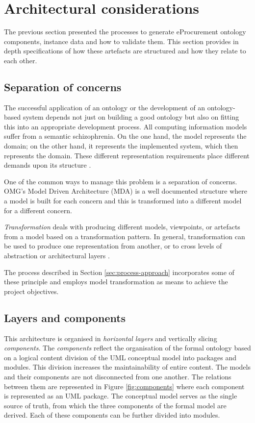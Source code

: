 \section{Architectural considerations}
\label{sec:architecture}

	The previous section presented the processes to generate eProcurement ontology components, instance data and how to validate them. This section provides in depth specifications of how these artefacts are structured and how they relate to each other. 

	\subsection{Separation of concerns}
	\label{sec:separation-conceprns}
	
	The successful application of an ontology or the development of an ontology-based system depends not just on building a good ontology but also on fitting this into an appropriate development  process.  All computing information models suffer from a semantic schizophrenia. On the one hand, the model represents the domain; on the other hand, it represents the implemented system, which then represents the domain. These different representation requirements place different demands upon its structure \cite{partridge2013}.
	
	One of the common ways to manage this problem is a separation of concerns. OMG's Model Driven Architecture (MDA) \cite{mda-paper} is a well documented structure where a model is built for each concern and this is transformed into a different model for a different concern. 
	
	\textit{Transformation} deals with producing different models, viewpoints, or artefacts from a model based on a transformation pattern. In general, transformation can be used to produce one representation from another, or to cross levels of abstraction or architectural layers \cite{mda-guide2}. 
	
	The process described in Section \ref{sec:process-approach} incorporates some of these principle and employs model transformation as means to achieve the project objectives.

	
	\subsection{Layers and components}
	\label{sec:layers-components}
	
	This architecture is organised in \textit{horizontal layers} and vertically slicing \textit{components}. The \textit{components} reflect the organisation of the formal ontology based on a logical content division of the UML conceptual model into packages and modules. This division increases the maintainability of entire content. The models and their components are not disconnected from one another. The relations between them are represented in Figure \ref{fig:components} where each component is represented as an UML package. The conceptual model serves as the single source of truth, from which the three components of the formal model are derived. Each of these components can be further divided into modules. 
	
